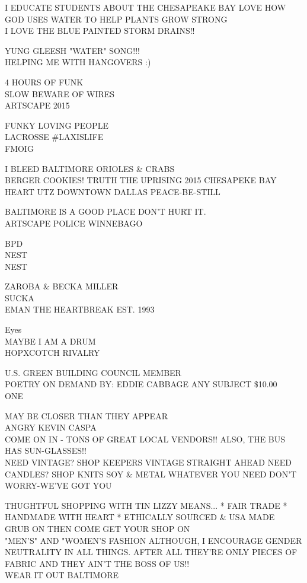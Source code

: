 \documentclass[10pt,letterpaper]{article}
\begin{document}
I EDUCATE STUDENTS ABOUT THE CHESAPEAKE BAY LOVE HOW GOD USES WATER TO HELP PLANTS GROW STRONG\\
I LOVE THE BLUE PAINTED STORM DRAINS!!

YUNG GLEESH "WATER" SONG!!!\\
HELPING ME WITH HANGOVERS :)

4 HOURS OF FUNK\\
SLOW BEWARE OF WIRES\\
ARTSCAPE 2015

FUNKY LOVING PEOPLE\\
LACROSSE \#LAXISLIFE\\
FMOIG

I BLEED BALTIMORE ORIOLES \& CRABS\\
BERGER COOKIES!  TRUTH THE UPRISING 2015 CHESAPEKE BAY HEART UTZ DOWNTOWN DALLAS PEACE{-}BE{-}STILL

BALTIMORE IS A GOOD PLACE DON'T HURT IT.\\
ARTSCAPE POLICE WINNEBAGO

BPD\\
NEST\\
NEST

ZAROBA \& BECKA MILLER\\
SUCKA\\
EMAN THE HEARTBREAK EST. 1993

Eyes\\
MAYBE I AM A DRUM\\
HOPXCOTCH RIVALRY

U.S. GREEN BUILDING COUNCIL MEMBER\\
POETRY ON DEMAND BY: EDDIE CABBAGE ANY SUBJECT \$10.00\\
ONE

MAY BE CLOSER THAN THEY APPEAR\\
ANGRY KEVIN CASPA\\
COME ON IN {-} TONS OF GREAT LOCAL VENDORS!! ALSO, THE BUS HAS SUN{-}GLASSES!!\\
NEED VINTAGE?  SHOP KEEPERS VINTAGE STRAIGHT AHEAD NEED CANDLES? SHOP KNITS SOY \& METAL WHATEVER YOU NEED DON'T WORRY{-}WE'VE GOT YOU

THUGHTFUL SHOPPING WITH TIN LIZZY MEANS... * FAIR TRADE * HANDMADE WITH HEART * ETHICALLY SOURCED \& USA MADE\\
GRUB ON THEN COME GET YOUR SHOP ON\\
"MEN'S" AND "WOMEN'S  FASHION ALTHOUGH, I ENCOURAGE GENDER NEUTRALITY IN ALL THINGS.  AFTER ALL THEY'RE ONLY PIECES OF FABRIC AND THEY AIN'T THE BOSS OF US!!\\
WEAR IT OUT BALTIMORE
\end{document}
